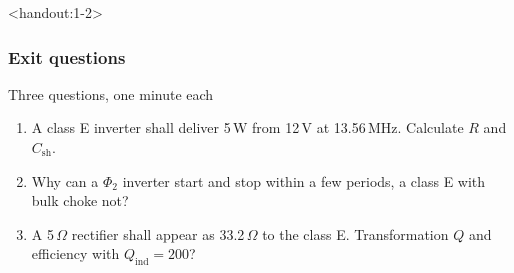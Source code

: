 \begin{frame}<handout:1-2>
	\frametitle{Exit questions}
	\begin{varblock}[\textwidth]{Three questions, one minute each}
		\begin{enumerate}
			\item A class E inverter shall deliver 5\,W from 12\,V at 13.56\,MHz. Calculate $R$ and $C_\mathrm{sh}$.
			\item Why can a $\Phi_2$ inverter start and stop within a few periods, a class E with bulk choke not?
			\item A 5\,$\Omega$ rectifier shall appear as 33.2\,$\Omega$ to the class E. Transformation $Q$ and efficiency with $Q_\mathrm{ind}=200$?
		\end{enumerate}
	\end{varblock}
\end{frame}

